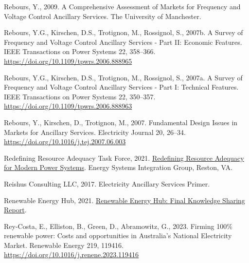 \documentclass[12pt,a4paper,]{report}
\newlength{\cslhangindent}
\newenvironment{CSLReferences}[2] %
 {%
  \setlength{\parindent}{0pt}
  \ifodd #1 \everypar{\setlength{\hangindent}{\cslhangindent}}\ignorespaces\fi
  \ifnum #2 > 0
  \setlength{\parskip}{#2\baselineskip}
  \fi
 }%
 {}
\begin{document}
\begin{CSLReferences}{1}{0}
\leavevmode{}%
Rebours, Y., 2009. A {Comprehensive Assessment} of {Markets} for
{Frequency} and {Voltage Control Ancillary Services}. The University of
Manchester.

\leavevmode{}%
Rebours, Y.G., Kirschen, D.S., Trotignon, M., Rossignol, S., 2007b. A
{Survey} of {Frequency} and {Voltage Control Ancillary Services} - {Part
II}: {Economic Features}. IEEE Transactions on Power Systems 22,
358--366. \url{https://doi.org/10.1109/tpwrs.2006.888965}

\leavevmode{}%
Rebours, Y.G., Kirschen, D.S., Trotignon, M., Rossignol, S., 2007a. A
{Survey} of {Frequency} and {Voltage Control Ancillary Services} - {Part
I}: {Technical Features}. IEEE Transactions on Power Systems 22,
350--357. \url{https://doi.org/10.1109/tpwrs.2006.888963}

\leavevmode{}%
Rebours, Y., Kirschen, D., Trotignon, M., 2007. Fundamental {Design
Issues} in {Markets} for {Ancillary Services}. Electricity Journal 20,
26--34. \url{https://doi.org/10.1016/j.tej.2007.06.003}

\leavevmode{}%
Redefining Resource Adequacy Task Force, 2021.
\href{https://www.esig.energy/wp-content/uploads/2021/08/ESIG-Redefining-Resource-Adequacy-2021.pdf}{Redefining
{Resource Adequacy} for {Modern Power Systems}}. Energy Systems
Integration Group, Reston, VA.

\leavevmode{}%
Reishus Consulting LLC, 2017. Electricity {Ancillary Services Primer}.

\leavevmode{}%
Renewable Energy Hub, 2021.
\href{https://arena.gov.au/assets/2021/04/renewable-energy-hub-final-report.pdf}{Renewable
{Energy Hub}: {Final Knowledge Sharing Report}}.

\leavevmode{}%
Rey-Costa, E., Elliston, B., Green, D., Abramowitz, G., 2023. Firming
100\% renewable power: {Costs} and opportunities in {Australia}'s
{National Electricity Market}. Renewable Energy 219, 119416.
\url{https://doi.org/10.1016/j.renene.2023.119416}


\end{CSLReferences}
\end{document}
